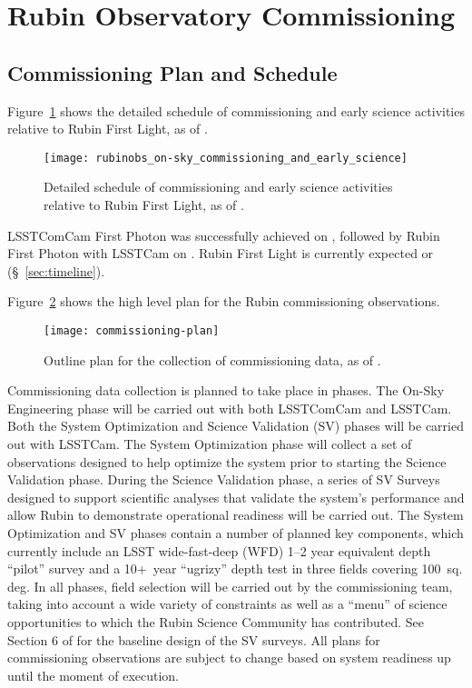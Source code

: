\section{Rubin Observatory Commissioning}
\label{sec:commissioning}

\subsection{Commissioning Plan and Schedule}
\label{ssec:commissioning-schedule}

Figure~\ref{fig:commissioning-es-schedule} shows the detailed schedule of commissioning and early science activities relative to Rubin First Light, as of \currentdate.
\begin{figure}[htb]
\centering
\texttt{[image: rubinobs\_on-sky\_commissioning\_and\_early\_science]}
\caption{Detailed schedule of commissioning  and early science activities relative to Rubin First Light, as of \currentdate.}
\label{fig:commissioning-es-schedule}
\vspace{0.1cm}
\end{figure}
LSSTComCam First Photon was successfully achieved on \ccfpdate, followed by Rubin  First Photon with LSSTCam on \lcfpdate.
Rubin First Light is currently expected or \rfldate (\S~\ref{sec:timeline}). 

Figure~\ref{fig:commissioning} shows the high level plan for the Rubin commissioning observations. 
\begin{figure}[htb]
\centering
\texttt{[image: commissioning-plan]}
\caption{Outline plan for the collection of commissioning data, as of \currentdate.}
\label{fig:commissioning}
\end{figure}
Commissioning data collection is planned to take place in phases.
The On-Sky Engineering phase will be carried out with both LSSTComCam and LSSTCam.
Both the System Optimization and Science Validation (SV) phases will be carried out with LSSTCam. 
The System Optimization phase will collect a set of observations designed to help optimize the system prior to starting the Science Validation phase.
During the Science Validation phase, a series of SV Surveys designed to support scientific analyses that validate the system's performance and allow Rubin to demonstrate operational readiness will be carried out.
The System Optimization and SV phases contain a number of planned key components, which currently include an LSST wide-fast-deep (WFD) 1--2 year equivalent depth ``pilot'' survey and a 
10+~year ``ugrizy'' depth test in three fields covering 100~sq. deg.
In all phases, field selection will be carried out by the commissioning team, taking into account a wide variety of constraints as well as a ``menu'' of science opportunities to which the Rubin Science Community has contributed.
See Section 6 of  for the baseline design of the SV surveys.
All plans for commissioning observations are subject to change based on system readiness up until the moment of execution. 

